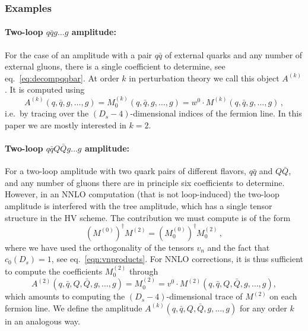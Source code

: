 
\subsubsection{Examples}

\paragraph{Two-loop $q\bar qg\ldots g$ amplitude:}
For the case of an amplitude with a pair $q\bar q$ of external
quarks and any number of external gluons,
there is a single coefficient to determine, 
see eq.~\eqref{eq:decompqqbar}. At order $k$ in perturbation
theory we call this object $A^{(k)}$. It is
computed using
\begin{equation}\label{eq:qqProj}
    A^{(k)}(q,\bar q,g,\ldots,g)=M^{(k)}_0(q,\bar q,g,\ldots,g) =
	w^0\cdot M^{(k)}(q,\bar q,g,\ldots,g)\,,
\end{equation}
i.e.\ by
tracing over the $(D_s-4)$-dimensional indices of the
fermion line. In this paper we are mostly interested in $k=2$.

\paragraph{Two-loop $q\bar qQ\bar Qg\ldots g$ amplitude:}
For a
two-loop amplitude with two quark pairs of 
different flavors, $q\bar q$ and $Q\bar Q$, and any number of
gluons there are in principle six coefficients to determine. 
However, in an NNLO computation (that is not loop-induced) 
the two-loop amplitude is 
interfered with the tree amplitude, which has a single tensor
structure in the HV scheme. The contribution we must compute is of the form
\begin{equation}\label{eq:qqQQProj}
  \left(M^{(0)}\right)^\dagger M^{(2)}=
  \left(M^{(0)}_0\right)^\dagger M^{(2)}_0\,,
\end{equation}
where we have used the orthogonality of the tensors
$v_n$ and the fact that $c_0(D_s)=1$, see 
eq.~\eqref{eqn:vnproducts}. 
For NNLO corrections, it is
thus sufficient to compute the coefficients
$M^{(2)}_0$ through
\begin{equation}
  \label{eq:AmplitudeDefinition}
  A^{(2)}(q,\bar q,Q,\bar Q,g,\ldots,g)=
  M^{(2)}_0 = v^0 \cdot 
  M^{(2)}(q,\bar q,Q,\bar Q,g,\ldots,g),
\end{equation}
which amounts to computing the 
$(D_s-4)$-dimensional trace of $M^{(2)}$ on
each fermion line.  
We define the amplitude
$A^{(k)}(q,\bar q,Q,\bar Q,g,\ldots,g)$ for any order $k$
in an analogous way.

